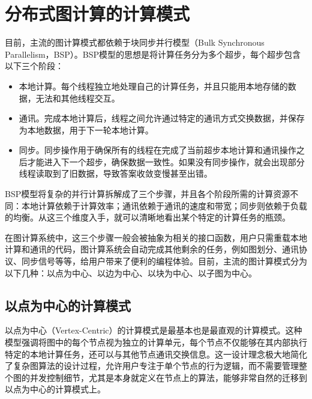 \section{分布式图计算的计算模式}
\label{sec:distribution_model}

目前，主流的图计算模式都依赖于块同步并行模型（Bulk Synchronous Parallelism，BSP）。BSP模型的思想是将计算任务分为多个超步，每个超步包含以下三个阶段：

\begin{itemize}
    \item 本地计算。每个线程独立地处理自己的计算任务，并且只能用本地存储的数据，无法和其他线程交互。
    \item 通讯。完成本地计算后，线程之间允许通过特定的通讯方式交换数据，并保存为本地数据，用于下一轮本地计算。
    \item 同步。同步操作用于确保所有的线程在完成了当前超步本地计算和通讯操作之后才能进入下一个超步，确保数据一致性。如果没有同步操作，就会出现部分线程读取到了旧数据，导致答案收敛变慢甚至出错。
\end{itemize}

BSP模型将复杂的并行计算拆解成了三个步骤，并且各个阶段所需的计算资源不同：本地计算依赖于计算效率；通讯依赖于通讯的速度和带宽；同步则依赖于负载的均衡。从这三个维度入手，就可以清晰地看出某个特定的计算任务的瓶颈。

在图计算系统中，这三个步骤一般会被抽象为相关的接口函数，用户只需重载本地计算和通讯的代码，图计算系统会自动完成其他剩余的任务，例如图划分、通讯协议、同步信号等等，给用户带来了便利的编程体验。目前，主流的图计算模式分为以下几种：以点为中心、以边为中心、以块为中心、以子图为中心。

\subsection{以点为中心的计算模式}

以点为中心（Vertex-Centric）的计算模式是最基本也是最直观的计算模式。这种模型强调将图中的每个节点视为独立的计算单元，每个节点不仅能够在其内部执行特定的本地计算任务，还可以与其他节点通讯交换信息。这一设计理念极大地简化了复杂图算法的设计过程，允许用户专注于单个节点的行为逻辑，而不需要管理整个图的并发控制细节，尤其是本身就定义在节点上的算法，能够非常自然的迁移到以点为中心的计算模式上。

